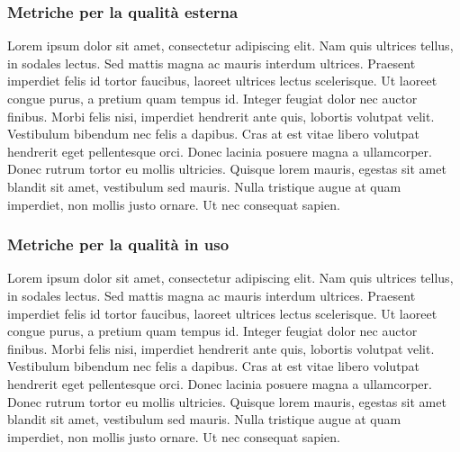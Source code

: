 \subsubsection{Metriche per la qualità esterna}
Lorem ipsum dolor sit amet, consectetur adipiscing elit. Nam quis ultrices tellus, in sodales lectus. Sed mattis magna ac mauris interdum ultrices. Praesent imperdiet felis id tortor faucibus, laoreet ultrices lectus scelerisque. Ut laoreet congue purus, a pretium quam tempus id. Integer feugiat dolor nec auctor finibus. Morbi felis nisi, imperdiet hendrerit ante quis, lobortis volutpat velit. Vestibulum bibendum nec felis a dapibus. Cras at est vitae libero volutpat hendrerit eget pellentesque orci. Donec lacinia posuere magna a ullamcorper. Donec rutrum tortor eu mollis ultricies. Quisque lorem mauris, egestas sit amet blandit sit amet, vestibulum sed mauris. Nulla tristique augue at quam imperdiet, non mollis justo ornare. Ut nec consequat sapien.

\subsubsection{Metriche per la qualità in uso}
Lorem ipsum dolor sit amet, consectetur adipiscing elit. Nam quis ultrices tellus, in sodales lectus. Sed mattis magna ac mauris interdum ultrices. Praesent imperdiet felis id tortor faucibus, laoreet ultrices lectus scelerisque. Ut laoreet congue purus, a pretium quam tempus id. Integer feugiat dolor nec auctor finibus. Morbi felis nisi, imperdiet hendrerit ante quis, lobortis volutpat velit. Vestibulum bibendum nec felis a dapibus. Cras at est vitae libero volutpat hendrerit eget pellentesque orci. Donec lacinia posuere magna a ullamcorper. Donec rutrum tortor eu mollis ultricies. Quisque lorem mauris, egestas sit amet blandit sit amet, vestibulum sed mauris. Nulla tristique augue at quam imperdiet, non mollis justo ornare. Ut nec consequat sapien.



